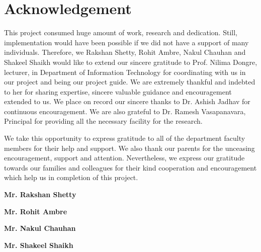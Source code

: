 \chapter*{Acknowledgement}
\hspace{0.26in}This project consumed huge amount of work, research and dedication. Still, implementation would have been possible if we did not have a support of many individuals. Therefore, we Rakshan Shetty, Rohit Ambre, Nakul Chauhan and Shakeel Shaikh would like to extend our sincere gratitude to Prof. Nilima Dongre, lecturer, in Department of Information Technology for coordinating with us in our project and being our project guide. We are extremely thankful and indebted to her for sharing expertise, sincere valuable guidance and encouragement extended to us. We place on record our sincere thanks to Dr. Ashish Jadhav for continuous encouragement. We are also grateful to Dr. Ramesh Vasapanavara, Principal for providing all the necessary facility for the research. 
\par We take this opportunity to express gratitude to all of the department faculty members for their help and support. We also thank our parents for the unceasing encouragement, support and attention. Nevertheless, we express our gratitude towards our families and colleagues for their kind cooperation and encouragement which help us in completion of this project.

\vspace{0.5in}
\begin{flushright}
{\bf Mr. Rakshan Shetty}
\end{flushright}

\begin{flushright}
{\bf Mr. Rohit Ambre}
\end{flushright}

\begin{flushright}
{\bf Mr. Nakul Chauhan}
\end{flushright}

\begin{flushright}
{\bf Mr. Shakeel Shaikh}
\end{flushright}